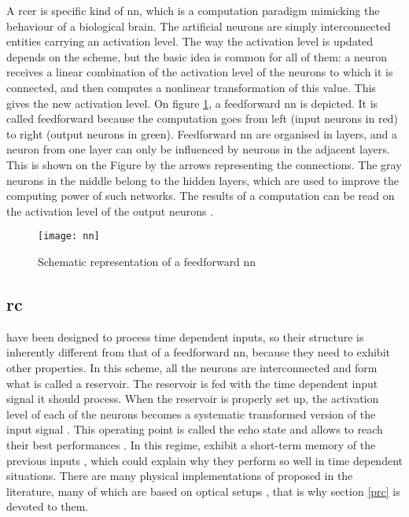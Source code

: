 A \gls{rcer} is specific kind of \gls{nn}, which is a computation paradigm mimicking the behaviour of a biological brain. The artificial neurons are simply interconnected entities carrying an activation level. The way the activation level is updated depends on the scheme, but the basic idea is common for all of them: a neuron receives a linear combination of the activation level of the neurons to which it is connected, and then computes a nonlinear transformation of this value. This gives the new activation level. On figure \ref{nn}, a feedforward \gls{nn} is depicted. It is called feedforward because the computation goes from left (input neurons in red) to right (output neurons in green). Feedforward \gls{nn} are organised in layers, and a neuron from one layer can only be influenced by neurons in the adjacent layers. This is shown on the Figure by the arrows representing the connections. The gray neurons in the middle belong to the hidden layers, which are used to improve the computing power of such networks. The results of a computation can be read on the activation level of the output neurons \cite[p.727]{russell2010artificial}\cite[p.225]{bishop2006pattern}.

\begin{figure}[h]
	\centering
	\texttt{[image: nn]}
	\caption{Schematic representation of a feedforward \gls{nn}}
	\label{nn}
\end{figure}


\subsection{\acrlong{rc}}

\rcer have been designed to process time dependent inputs, so their structure is inherently different from that of a feedforward \gls{nn}, because they need to exhibit other properties. In this scheme, all the neurons are interconnected and form what is called a reservoir. The reservoir is fed with the time dependent input signal it should process. When the reservoir is properly set up, the activation level of each of the neurons becomes a systematic transformed version of the input signal \cite{Jaeger2004}. This operating point is called the echo state and allows \rcer to reach their best performances \cite{Goudarzi2014ACS, JaegerH.2001Tesa}. In this regime, \rcer exhibit a short-term memory of the previous inputs \cite{Jaeger2004}, which could explain why they perform so well in time dependent situations. There are many physical implementations of \rcer proposed in the literature, many of which are based on optical setups \cite{VanderSande2017}, that is why section \ref{prc} is devoted to them.\\


